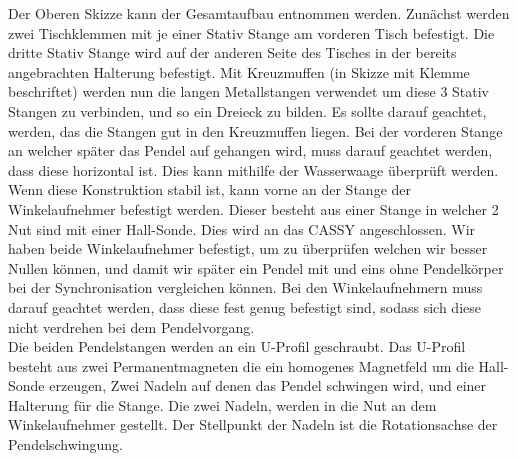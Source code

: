 \documentclass[twoside]{protokoll}
\begin{document}
Der Oberen Skizze kann der Gesamtaufbau entnommen werden. 
Zunächst werden zwei Tischklemmen mit je einer Stativ Stange am vorderen Tisch befestigt.
Die dritte Stativ Stange wird auf der anderen Seite des Tisches in der bereits angebrachten Halterung befestigt. 
Mit Kreuzmuffen (in Skizze mit Klemme beschriftet) werden nun die langen Metallstangen verwendet um diese 3 Stativ Stangen zu verbinden, und so ein Dreieck zu bilden.
Es sollte darauf geachtet, werden, das die Stangen gut in den Kreuzmuffen liegen. 
Bei der vorderen Stange an welcher später das Pendel auf gehangen wird, muss darauf geachtet werden, dass diese horizontal ist.
Dies kann mithilfe der Wasserwaage überprüft werden.\\

Wenn diese Konstruktion stabil ist, kann vorne an der Stange der Winkelaufnehmer befestigt werden. 
Dieser besteht aus einer Stange in welcher 2 Nut sind mit einer Hall-Sonde. 
Dies wird an das CASSY angeschlossen.
Wir haben beide Winkelaufnehmer befestigt, um zu überprüfen welchen wir besser Nullen können, und damit wir später ein Pendel mit und eins ohne Pendelkörper bei der Synchronisation vergleichen können.
Bei den Winkelaufnehmern muss darauf geachtet werden, dass diese fest genug befestigt sind, sodass sich diese nicht verdrehen bei dem Pendelvorgang.\\

Die beiden Pendelstangen werden an ein U-Profil geschraubt.
Das U-Profil besteht aus zwei Permanentmagneten die ein homogenes Magnetfeld um die Hall-Sonde erzeugen, Zwei Nadeln auf denen das Pendel schwingen wird, und einer Halterung für die Stange. 
Die zwei Nadeln, werden in die Nut an dem Winkelaufnehmer gestellt.
Der Stellpunkt der Nadeln ist die Rotationsachse der Pendelschwingung. \\
\end{document}
